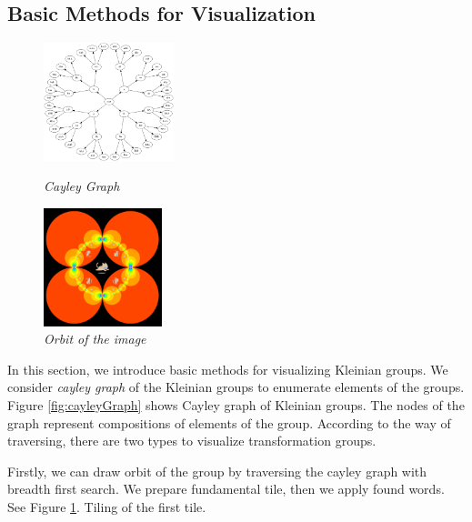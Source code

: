 
\subsection{Basic Methods for Visualization}

\begin{figure}[htbp]
 \begin{minipage}[t]{0.5\hsize}
  \center
  \includegraphics[height=1.35in, keepaspectratio]{img/cayleyGraph.png}
  \caption{\textit{Cayley Graph}}
  \label{fig:cayleyGraph}
  \hspace*{\fill}
 \end{minipage}
 \begin{minipage}[t]{0.5\hsize}
  \center
  \includegraphics[height=1.35in, keepaspectratio]{img/preparation/basic/catOrbit.png}
  \caption{\textit{Orbit of the image}}
  \label{fig:orbitCat}
  \hspace*{\fill}
 \end{minipage}
\end{figure}

In this section, we introduce basic methods for visualizing Kleinian groups.
We consider \textit{cayley graph} of the Kleinian groups to enumerate elements
of the groups.
Figure \ref{fig:cayleyGraph} shows Cayley graph of Kleinian groups. The nodes of the graph
represent compositions of elements of the group.
According to the way of traversing, 
there are two types to visualize transformation groups.

Firstly, we can draw orbit of the group by traversing the cayley graph with
breadth first search.
We prepare fundamental tile, then we apply found words.
See Figure \ref{fig:orbitCat}.
Tiling of the first tile.

